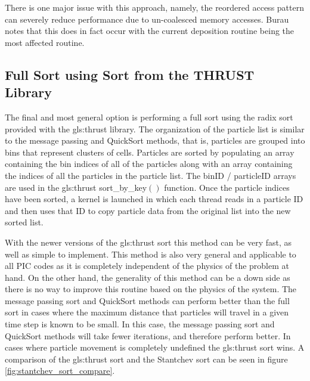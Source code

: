 	There is one major issue with this approach, namely, the reordered access pattern can severely reduce performance due to un-coalesced memory accesses. Burau notes that this does in fact occur with the current deposition routine being the most affected routine. \cite{Burau2010} %

	\subsection{Full Sort using Sort from the THRUST Library}
	The final and most general option is performing a full sort using the radix sort provided with the \gls{gls:thrust} library.\cite{NVIDIACorporation2011a} The organization of the particle list is similar to the message passing and QuickSort methods, that is, particles are grouped into bins that represent clusters of cells. Particles are sorted by populating an array containing the bin indices of all of the particles along with an array containing the indices of all the particles in the particle list. The binID / particleID arrays are used in the \gls{gls:thrust} sort\_by\_key$()$ function. Once the particle indices have been sorted, a kernel is launched in which each thread reads in a particle ID and then uses that ID to copy particle data from the original list into the new sorted list. 

	With the newer versions of the \gls{gls:thrust} sort this method can be very fast, as well as simple to implement. This method is also very general and applicable to all PIC codes as it is completely independent of the physics of the problem at hand. On the other hand, the generality of this method can be a down side as there is no way to improve this routine based on the physics of the system. The message passing sort and QuickSort methods can perform better than the full sort in cases where the maximum distance that particles will travel in a given time step is known to be small. In this case, the message passing sort and QuickSort methods will take fewer iterations, and therefore perform better. In cases where particle movement is completely undefined the \gls{gls:thrust} sort wins. A comparison of the \gls{gls:thrust} sort and the Stantchev sort can be seen in figure \ref{fig:stantchev_sort_compare}. 





